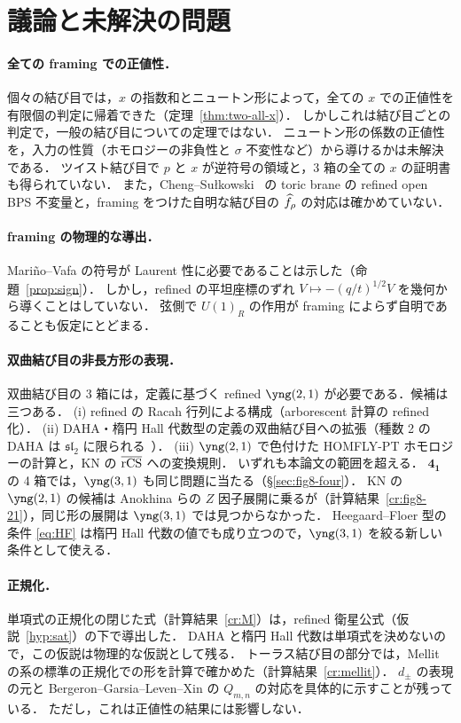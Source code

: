 \section{議論と未解決の問題}\label{sec:discussion}

\paragraph{全ての framing での正値性．}
個々の結び目では，$x$ の指数和とニュートン形によって，全ての $x$ での正値性を有限個の判定に帰着できた（定理~\ref{thm:two-all-x}）．
しかしこれは結び目ごとの判定で，一般の結び目についての定理ではない．
ニュートン形の係数の正値性を，入力の性質（ホモロジーの非負性と $\sigma$ 不変性など）から導けるかは未解決である．
ツイスト結び目で $p$ と $x$ が逆符号の領域と，3 箱の全ての $x$ の証明書も得られていない．
また，Cheng--Sułkowski~\cite{Cheng21} の toric brane の refined open BPS 不変量と，framing をつけた自明な結び目の $\widehat{f}_\rho$ の対応は確かめていない．

\paragraph{framing の物理的な導出．}
Mariño--Vafa の符号が Laurent 性に必要であることは示した（命題~\ref{prop:sign}）．
しかし，refined の平坦座標のずれ $V\mapsto-(q/t)^{1/2}V$ を幾何から導くことはしていない．
弦側で $U(1)_R$ の作用が framing によらず自明であることも仮定にとどまる．

\paragraph{双曲結び目の非長方形の表現．}
双曲結び目の 3 箱には，定義に基づく refined $\yng(2,1)$ が必要である．候補は三つある．
(i) refined の Racah 行列による構成（arborescent 計算の refined 化）．
(ii) DAHA・楕円 Hall 代数型の定義の双曲結び目への拡張（種数 2 の DAHA は $\mathfrak{sl}_2$ に限られる~\cite{Arthamonov15}）．
(iii) $\yng(2,1)$ で色付けた HOMFLY-PT ホモロジーの計算と，KN の $\overline{\textrm{rCS}}$ への変換規則．
いずれも本論文の範囲を超える．
$\mathbf{4_1}$ の 4 箱では，$\yng(3,1)$ も同じ問題に当たる（\S\ref{sec:fig8-four}）．
KN の $\yng(2,1)$ の候補は Anokhina らの $Z$ 因子展開に乗るが（計算結果~\ref{cr:fig8-21}），同じ形の展開は $\yng(3,1)$ では見つからなかった．
Heegaard--Floer 型の条件 \eqref{eq:HF} は楕円 Hall 代数の値でも成り立つので，$\yng(3,1)$ を絞る新しい条件として使える．

\paragraph{正規化．}
単項式の正規化の閉じた式（計算結果~\ref{cr:M}）は，refined 衛星公式（仮説~\ref{hyp:sat}）の下で導出した．
DAHA と楕円 Hall 代数は単項式を決めないので，この仮説は物理的な仮説として残る．
トーラス結び目の部分では，Mellit の系の標準の正規化での形を計算で確かめた（計算結果~\ref{cr:mellit}）．
$d_\pm$ の表現の元と Bergeron--Garsia--Leven--Xin の $Q_{m,n}$ の対応を具体的に示すことが残っている．
ただし，これは正値性の結果には影響しない．

